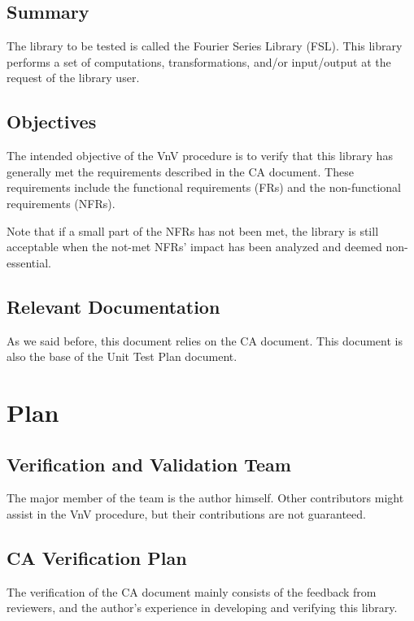 \documentclass[12pt, titlepage]{article}
\begin{document}
\subsection{Summary}

The library to be tested is called the Fourier Series Library (FSL). This library performs a set of computations, transformations, and/or input/output at the request of the library user.

\subsection{Objectives}

The intended objective of the VnV procedure is to verify that this library has generally met the requirements described in the CA document. These requirements include the functional requirements (FRs) and the non-functional requirements (NFRs).

Note that if a small part of the NFRs has not been met, the library is still acceptable when the not-met NFRs' impact has been analyzed and deemed non-essential.

\subsection{Relevant Documentation}

As we said before, this document relies on the CA document. This document is also the base of the Unit Test Plan document.


\section{Plan}
	
\subsection{Verification and Validation Team}

The major member of the team is the author himself. Other contributors might assist in the VnV procedure, but their contributions are not guaranteed.

\subsection{CA Verification Plan}

The verification of the CA document mainly consists of the feedback from reviewers, and the author's experience in developing and verifying this library. 
\end{document}
